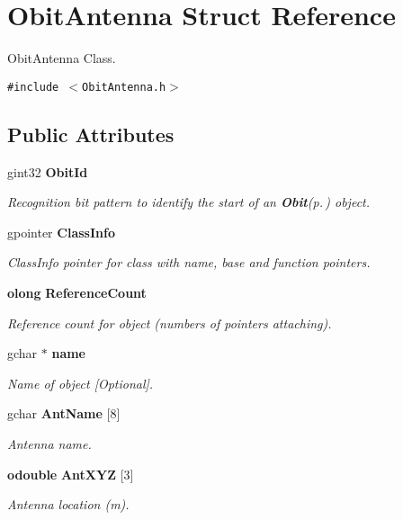 \section{Obit\-Antenna Struct Reference}
\label{structObitAntenna}
Obit\-Antenna Class.  


{\tt \#include $<$Obit\-Antenna.h$>$}

\subsection*{Public Attributes}
\begin{CompactItemize}
\item 
gint32 {\bf Obit\-Id}
\begin{CompactList}\small\item\em Recognition bit pattern to identify the start of an {\bf Obit}{\rm (p.\,\pageref{structObit})} object. \item\end{CompactList}\item 
gpointer {\bf Class\-Info}
\begin{CompactList}\small\item\em Class\-Info pointer for class with name, base and function pointers. \item\end{CompactList}\item 
{\bf olong} {\bf Reference\-Count}
\begin{CompactList}\small\item\em Reference count for object (numbers of pointers attaching). \item\end{CompactList}\item 
gchar $\ast$ {\bf name}
\begin{CompactList}\small\item\em Name of object [Optional]. \item\end{CompactList}\item 
gchar {\bf Ant\-Name} [8]
\begin{CompactList}\small\item\em Antenna name. \item\end{CompactList}\item 
{\bf odouble} {\bf Ant\-XYZ} [3]
\begin{CompactList}\small\item\em Antenna location (m). \item\end{CompactList}\item 

\end{CompactItemize}
